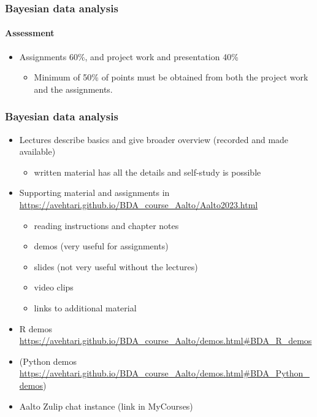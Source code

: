 \documentclass[english,t]{beamer}
\begin{document}
\begin{frame}
  \frametitle{Bayesian data analysis}  %
  \framesubtitle{Assessment}
  \begin{itemize}
  \item Assignments 60\%, and project work and presentation 40\%
     \begin{itemize}
     \item Minimum of 50\% of points must be obtained from both the project work and the assignments.
     \end{itemize}
  \end{itemize}

\end{frame}

\begin{frame}
  \frametitle{Bayesian data analysis}  %

  \begin{itemize}
  \item Lectures describe basics and give broader overview (recorded
    and made available)
    \begin{itemize}
    \item written material has all the details and self-study
      is possible
    \end{itemize}
  \item Supporting material and assignments in
    {\small\url{https://avehtari.github.io/BDA_course_Aalto/Aalto2023.html}}
    \begin{itemize}
    \item reading instructions and chapter notes
    \item demos (very useful for assignments)
    \item slides (not very useful without the lectures)
    \item video clips
    \item links to additional material
    \end{itemize}
   \item R demos {\small\url{https://avehtari.github.io/BDA_course_Aalto/demos.html\#BDA_R_demos}}
  \item (Python demos {\small\url{https://avehtari.github.io/BDA_course_Aalto/demos.html\#BDA_Python_demos})}
  \item Aalto Zulip chat instance (link in MyCourses)
  \end{itemize}

\end{frame}
\end{document}
